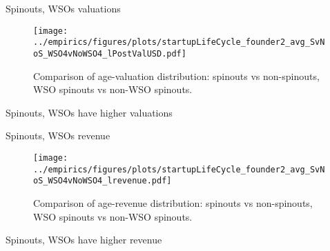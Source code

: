 \documentclass[english,usenames,dvipsnames]{beamer}
\begin{document}
\begin{frame}{Spinouts, WSOs valuations}
\begin{figure}
	\centering
	\texttt{[image: ../empirics/figures/plots/startupLifeCycle\_founder2\_avg\_SvNoS\_WSO4vNoWSO4\_lPostValUSD.pdf]}
	\caption{Comparison of age-valuation distribution: spinouts vs non-spinouts, WSO spinouts vs non-WSO spinouts.}
\end{figure}
\end{frame}

\begin{frame}{Spinouts, WSOs have higher valuations}
	\begin{table}
		\tiny
		\centering
		
		\caption{\footnotesize The regresssions above compare \textbf{valuation} in WSO4 spinouts, non-WSO4 spinouts and non-spinouts. The first regression uses no controls. The following three regressions in addition control for year effects, age effects, and / or cohort effects, in each case allowing the relevant effect to differ by State-NAICS4 combination. Standard errors are multi-way clustered at the state, NAICS4 and year levels.}
	\end{table}
\end{frame}

\begin{frame}{Spinouts, WSOs revenue}
\begin{figure}
	\centering
	\texttt{[image: ../empirics/figures/plots/startupLifeCycle\_founder2\_avg\_SvNoS\_WSO4vNoWSO4\_lrevenue.pdf]}
	\caption{Comparison of age-revenue distribution: spinouts vs non-spinouts, WSO spinouts vs non-WSO spinouts.}
\end{figure}
\end{frame}

\begin{frame}{Spinouts, WSOs have higher revenue}
\begin{table}
\tiny
\centering

\caption{\footnotesize The regresssions above compare \textbf{revenue} in WSO4 spinouts, non-WSO4 spinouts and non-spinouts. The first regression uses no controls. The following three regressions in addition control for year effects, age effects, and / or cohort effects, in each case allowing the relevant effect to differ by State-NAICS4 combination. Standard errors are multi-way clustered at the state, NAICS4 and year levels.}
\end{table}
\end{frame}
\end{document}
